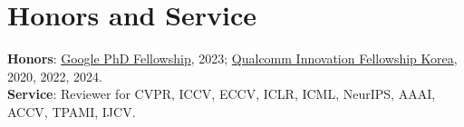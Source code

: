 \documentclass[letterpaper,11pt]{article}
\begin{document}
\section{Honors and Service}
\begin{itemize}[leftmargin=0.15in, label={}]
  \small{\item{
    \textbf{Honors}{: \href{https://research.google/programs-and-events/phd-fellowship/recipients/}{Google PhD Fellowship}, 2023; \href{https://www.qualcomm.com/research/university-relations/innovation-fellowship/2021-south-korea}{Qualcomm Innovation Fellowship Korea}, 2020, 2022, 2024.} \\
    \textbf{Service}{: Reviewer for CVPR, ICCV, ECCV, ICLR, ICML, NeurIPS, AAAI, ACCV, TPAMI, IJCV.}
  }}
\end{itemize}
\end{document}

